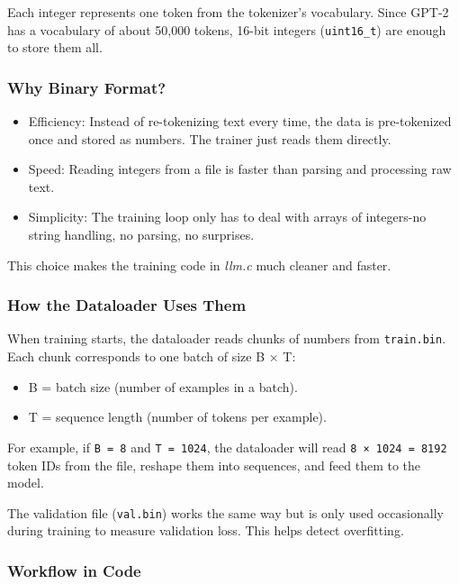 \documentclass[
  letterpaper,
  DIV=11,
  numbers=noendperiod]{scrreprt}
\providecommand{\tightlist}{%
  \setlength{\itemsep}{0pt}\setlength{\parskip}{0pt}}
\begin{document}
Each integer represents one token from the tokenizer's vocabulary. Since
GPT-2 has a vocabulary of about 50,000 tokens, 16-bit integers
(\texttt{uint16\_t}) are enough to store them all.

\subsubsection{Why Binary Format?}\label{why-binary-format}

\begin{itemize}
\tightlist
\item
  Efficiency: Instead of re-tokenizing text every time, the data is
  pre-tokenized once and stored as numbers. The trainer just reads them
  directly.
\item
  Speed: Reading integers from a file is faster than parsing and
  processing raw text.
\item
  Simplicity: The training loop only has to deal with arrays of
  integers-no string handling, no parsing, no surprises.
\end{itemize}

This choice makes the training code in \emph{llm.c} much cleaner and
faster.

\subsubsection{How the Dataloader Uses
Them}\label{how-the-dataloader-uses-them}

When training starts, the dataloader reads chunks of numbers from
\texttt{train.bin}. Each chunk corresponds to one batch of size B × T:

\begin{itemize}
\tightlist
\item
  B = batch size (number of examples in a batch).
\item
  T = sequence length (number of tokens per example).
\end{itemize}

For example, if \texttt{B\ =\ 8} and \texttt{T\ =\ 1024}, the dataloader
will read \texttt{8\ ×\ 1024\ =\ 8192} token IDs from the file, reshape
them into sequences, and feed them to the model.

The validation file (\texttt{val.bin}) works the same way but is only
used occasionally during training to measure validation loss. This helps
detect overfitting.

\subsubsection{Workflow in Code}\label{workflow-in-code}
\end{document}
